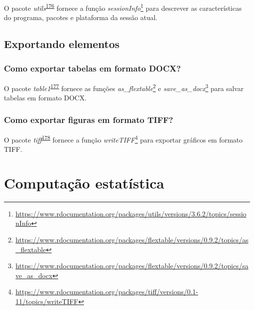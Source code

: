 \documentclass[
  a4paper,
]{book}
\renewcommand{\href}[2]{#2\footnote{\url{#1}}}
\newenvironment{infobox}[1]
  {
  \begin{itemize}
  \renewcommand{\labelitemi}{
    \raisebox{-.7\height}[0pt][0pt]{
      {\setkeys{Gin}{width=3em,keepaspectratio}
        \texttt{[image: \#1]}}
    }
  }
  \setlength{\fboxsep}{1em}
  \begin{blackbox}
  \item
  }
  {
  \end{blackbox}
  \end{itemize}
  }
\begin{document}
\begin{infobox}{images/Rlogo}
O pacote \emph{utils}\textsuperscript{\protect\hyperlink{ref-utils}{176}} fornece a função \href{https://www.rdocumentation.org/packages/utils/versions/3.6.2/topics/sessionInfo}{\emph{sessionInfo}} para descrever as características do programa, pacotes e plataforma da sessão atual.

\end{infobox}

\hypertarget{exportar}{%
\section{Exportando elementos}\label{exportar}}

\hypertarget{como-exportar-tabelas-em-formato-docx}{%
\subsection{Como exportar tabelas em formato DOCX?}\label{como-exportar-tabelas-em-formato-docx}}

\begin{infobox}{images/Rlogo}
O pacote \emph{table1}\textsuperscript{\protect\hyperlink{ref-flextable}{177}} fornece as funções \href{https://www.rdocumentation.org/packages/flextable/versions/0.9.2/topics/as_flextable}{\emph{as\_flextable}} e \href{https://www.rdocumentation.org/packages/flextable/versions/0.9.2/topics/save_as_docx}{\emph{save\_as\_docx}} para salvar tabelas em formato DOCX.

\end{infobox}

\hypertarget{como-exportar-figuras-em-formato-tiff}{%
\subsection{Como exportar figuras em formato TIFF?}\label{como-exportar-figuras-em-formato-tiff}}

\begin{infobox}{images/Rlogo}
O pacote \emph{tiff}\textsuperscript{\protect\hyperlink{ref-tiff}{178}} fornece a função \href{https://www.rdocumentation.org/packages/tiff/versions/0.1-11/topics/writeTIFF}{\emph{writeTIFF}} para exportar gráficos em formato TIFF.

\end{infobox}

\hypertarget{computacao-estatistica}{%
\chapter{\texorpdfstring{\textbf{Computação estatística}}{Computação estatística}}\label{computacao-estatistica}}
\end{document}
